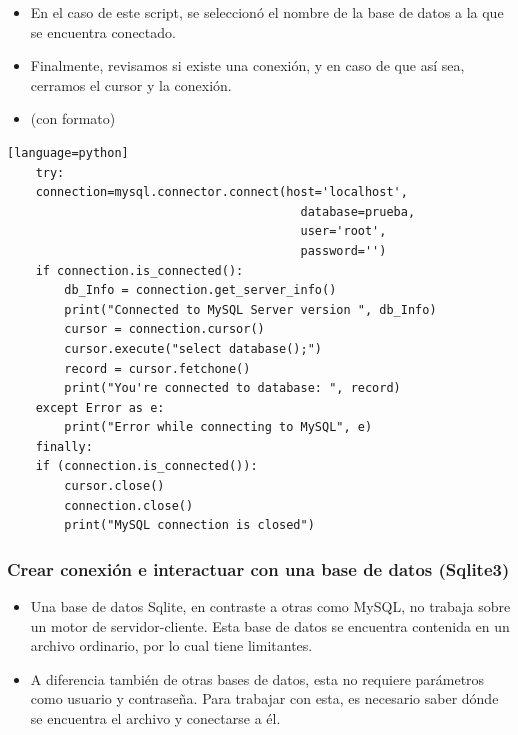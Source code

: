 \documentclass[hyperref={pdfpagelabels=false},xcolor=pst,pdf,fragile]{beamer}
\begin{document}
\begin{frame}
    \begin{itemize}
    \item En el caso de este script, se seleccionó el nombre de la base de datos a la que se encuentra conectado.
    \pause
    \item Finalmente, revisamos si existe una conexión, y en caso de que así sea, cerramos el cursor y la conexión.
    \end{itemize}
\end{frame}

\begin{frame} [fragile]
    \begin{itemize}
    \item (con formato)
    \end{itemize}
    \begin{lstlisting}[basicstyle=\tiny][language=python]
    try:
    connection=mysql.connector.connect(host='localhost',
                                         database=prueba,
                                         user='root',
                                         password='')
    if connection.is_connected():
        db_Info = connection.get_server_info()
        print("Connected to MySQL Server version ", db_Info)
        cursor = connection.cursor()
        cursor.execute("select database();")
        record = cursor.fetchone()
        print("You're connected to database: ", record)
    except Error as e:
        print("Error while connecting to MySQL", e)
    finally:
    if (connection.is_connected()):
        cursor.close()
        connection.close()
        print("MySQL connection is closed")
    \end{lstlisting}
\end{frame}

\begin{frame} 
    \frametitle{Crear conexión e interactuar con una base de datos (Sqlite3)}
    \begin{itemize}
    \item Una base de datos Sqlite, en contraste a otras como MySQL, no trabaja sobre un motor de servidor-cliente. Esta base de datos se encuentra contenida en un archivo ordinario, por lo cual tiene limitantes.
    \item A diferencia también de otras bases de datos, esta no requiere parámetros como usuario y contraseña. Para trabajar con esta, es necesario saber dónde se encuentra el archivo y conectarse a él.
    \end{itemize}
\end{frame}
\end{document}
